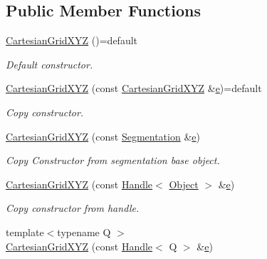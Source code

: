 \subsection*{Public Member Functions}
\begin{DoxyCompactItemize}
\item 
\hyperlink{class_d_d4hep_1_1_geometry_1_1_cartesian_grid_x_y_z_a84fc0950667c6d509b733dc2a7f2160a}{Cartesian\+Grid\+X\+YZ} ()=default
\begin{DoxyCompactList}\small\item\em Default constructor. \end{DoxyCompactList}\item 
\hyperlink{class_d_d4hep_1_1_geometry_1_1_cartesian_grid_x_y_z_ad9e0949791387ce85d4e611e7debc114}{Cartesian\+Grid\+X\+YZ} (const \hyperlink{class_d_d4hep_1_1_geometry_1_1_cartesian_grid_x_y_z}{Cartesian\+Grid\+X\+YZ} \&\hyperlink{_volumes_8cpp_a8a9a1f93e9b09afccaec215310e64142}{e})=default
\begin{DoxyCompactList}\small\item\em Copy constructor. \end{DoxyCompactList}\item 
\hyperlink{class_d_d4hep_1_1_geometry_1_1_cartesian_grid_x_y_z_ad82c02f00f16d9849f2cef9f622ac691}{Cartesian\+Grid\+X\+YZ} (const \hyperlink{class_d_d4hep_1_1_geometry_1_1_segmentation}{Segmentation} \&\hyperlink{_volumes_8cpp_a8a9a1f93e9b09afccaec215310e64142}{e})
\begin{DoxyCompactList}\small\item\em Copy Constructor from segmentation base object. \end{DoxyCompactList}\item 
\hyperlink{class_d_d4hep_1_1_geometry_1_1_cartesian_grid_x_y_z_a81acd66a472e7cea44351a2120ef789a}{Cartesian\+Grid\+X\+YZ} (const \hyperlink{class_d_d4hep_1_1_handle}{Handle}$<$ \hyperlink{class_d_d4hep_1_1_geometry_1_1_cartesian_grid_x_y_z_a14399d469a4ddf78e0df3e14276a3e4e}{Object} $>$ \&\hyperlink{_volumes_8cpp_a8a9a1f93e9b09afccaec215310e64142}{e})
\begin{DoxyCompactList}\small\item\em Copy constructor from handle. \end{DoxyCompactList}\item 
{\footnotesize template$<$typename Q $>$ }\\\hyperlink{class_d_d4hep_1_1_geometry_1_1_cartesian_grid_x_y_z_accc58924d7f9212a5b82f329f47bf9c0}{Cartesian\+Grid\+X\+YZ} (const \hyperlink{class_d_d4hep_1_1_handle}{Handle}$<$ Q $>$ \&\hyperlink{_volumes_8cpp_a8a9a1f93e9b09afccaec215310e64142}{e})

\end{DoxyCompactItemize}
